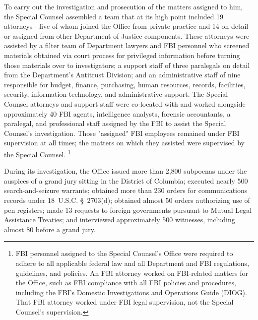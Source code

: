To carry out the investigation and prosecution of the matters assigned to him, the Special Counsel assembled a team that at its high point included 19 attorneys---five of whom joined the Office from private practice and 14 on detail or assigned from other Department of Justice components.
These attorneys were assisted by a filter team of Department lawyers and FBI personnel who screened materials obtained via court process for privileged information before turning those materials over to investigators; a support staff of three paralegals on detail from the Department's Antitrust Division; and an administrative staff of nine responsible for budget, finance, purchasing, human resources, records, facilities, security, information technology, and administrative support.
The Special Counsel attorneys and support staff were co-located with and worked alongside approximately 40 FBI agents, intelligence analysts, forensic accountants, a paralegal, and professional staff assigned by the FBI to assist the Special Counsel's investigation.
Those "assigned" FBI employees remained under FBI supervision at all times; the matters on which they assisted were supervised by the Special Counsel.%
\footnote{FBI personnel assigned to the Special Counsel's Office were required to adhere to all applicable federal law and all Department and FBI regulations, guidelines, and policies.
An FBI attorney worked on FBI-related matters for the Office, such as FBI compliance with all FBI policies and procedures, including the FBI's Domestic Investigations and Operations Guide (DIOG).
That FBI attorney worked under FBI legal supervision, not the Special Counsel's supervision.}

During its investigation, the Office issued more than 2,800 subpoenas under the auspices of a grand jury sitting in the District of Columbia; executed nearly 500 search-and-seizure warrants; obtained more than 230 orders for communications records under 18~U.S.C. \S~2703(d); obtained almost 50 orders authorizing use of pen registers; made 13 requests to foreign governments pursuant to Mutual Legal Assistance Treaties; and interviewed approximately 500 witnesses, including almost 80 before a grand jury.

\hr

